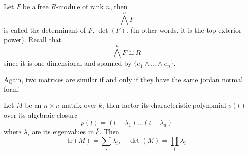 \documentclass[openany]{book}
\newcommand{\tr}{\text{tr}}
\begin{document}
\begin{defn}[determinant]
    Let $F$ be a free $R$-module of rank $n$, then 
    \begin{equation*}
        \bigwedge^nF
    \end{equation*}
    is called the determinant of $F$, $\det(F)$. (In other words, it is the top exterior power). Recall that 
    \begin{equation*}
        \bigwedge^nF\cong R
    \end{equation*}
    since it is one-dimensional and spanned by $\{e_1\wedge\dots\wedge e_n\}$.
\end{defn}

\begin{warn}
    Again, two matrices are similar if and only if they have the same jordan normal form!
\end{warn}


\begin{warn}
    Let $M$ be an $n\times n$ matrix over $k$, then factor its characteristic polynomial $p(t)$ over its algebraic closure 
    \begin{equation*}
        p(t)=(t-\lambda_1)\dots(t-\lambda_d)
    \end{equation*}
    where $\lambda_i$ are its eigenvalues in $\bar{k}$. Then 
    \begin{equation*}
        \tr(M)=\sum_{i}\lambda_i, \quad \det(M)=\prod_i\lambda_i
    \end{equation*}

\end{warn}
\end{document}

